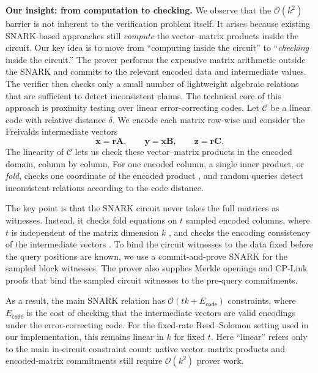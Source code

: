 \documentclass[conference,compsoc]{IEEEtran}
\newcommand{\mat}{\mathbf}          %
\newcommand{\vect}{\mathbf}         %
\theoremstyle{plain}
\theoremstyle{definition}
\theoremstyle{remark}
\providecommand{\DIFaddtex}[1]{{\protect\color{DIFADD} \sf #1}} %
\providecommand{\DIFaddbegin}{} %
\providecommand{\DIFaddend}{} %
\providecommand{\DIFadd}[1]{\texorpdfstring{\DIFaddtex{#1}}{#1}} %
\providecommand{\DIFaddincludegraphics}[2][]{{\color{blue}\fbox{\DIFOincludegraphics[#1]{#2}}}} %
\DeclareRobustCommand{\DIFaddbegin}{\DIFOaddbegin \let\includegraphics\DIFaddincludegraphics} %
\DeclareRobustCommand{\DIFaddend}{\DIFOaddend \let\includegraphics\DIFOincludegraphics} %
\begin{document}
\noindent\textbf{Our insight: from computation to checking.}
We observe that the \(\mathcal{O}(k^2)\) barrier is not inherent to the
verification problem itself.  It arises because existing SNARK-based approaches
still \emph{compute} the vector--matrix products inside the circuit.  Our key
idea is to move from ``computing inside the circuit'' to ``\emph{checking} inside the
circuit.''  The prover performs the expensive matrix arithmetic outside the
SNARK and commits to the relevant encoded data and intermediate values.  The
verifier then checks only a small number of lightweight algebraic relations
that are sufficient to detect inconsistent claims.
The technical core of this approach is proximity testing over linear
error-correcting codes.  Let \(\mathcal{C}\) be a linear code with relative
distance \(\delta\).  We encode each matrix row-wise and consider the Freivalds
intermediate vectors
\[
  \vect{x}=\vect{r}\mat{A},\qquad
  \vect{y}=\vect{x}\mat{B},\qquad
  \vect{z}=\vect{r}\mat{C}.
\]
The linearity of \(\mathcal{C}\) lets us check these vector--matrix products in
the encoded domain, column by column.  For one encoded column, a single inner
product, or \emph{fold}, checks one coordinate of the encoded product \DIFaddbegin \DIFadd{, and
random queries detect inconsistent relations according to the code distance}\DIFaddend .

The key point is that the SNARK circuit never takes the full matrices as
witnesses.  Instead, it checks fold equations on \(t\) sampled encoded columns,
where \(t\) is independent of the matrix dimension \(k\) \DIFaddbegin \DIFadd{, and checks the
encoding consistency }\DIFaddend of the intermediate vectors .
To bind the circuit witnesses to the data fixed before the query positions are known,
we use a commit-and-prove SNARK for the sampled block witnesses.  The prover
also supplies Merkle  \DIFaddbegin \DIFadd{openings and }\DIFaddend CP-Link proofs  \DIFaddbegin \DIFadd{that bind the sampled circuit
witnesses to the pre-query commitments}\DIFaddend .


As a result, the main SNARK relation has
\(\mathcal{O}(tk+E_{\mathsf{code}})\) constraints, where
\(E_{\mathsf{code}}\) is the cost of checking that the
intermediate vectors are valid encodings under the error-correcting code. For the fixed-rate Reed--Solomon setting used in our implementation,
this remains linear in  \DIFaddbegin \DIFadd{\(k\) }\DIFaddend for fixed \(t\).   \DIFaddbegin \DIFadd{Here ``linear'' refers only to
the main in-circuit constraint count: native vector--matrix products and
encoded-matrix commitments still require \(\mathcal{O}(k^2)\) prover work.}\DIFaddend \\
\end{document}
